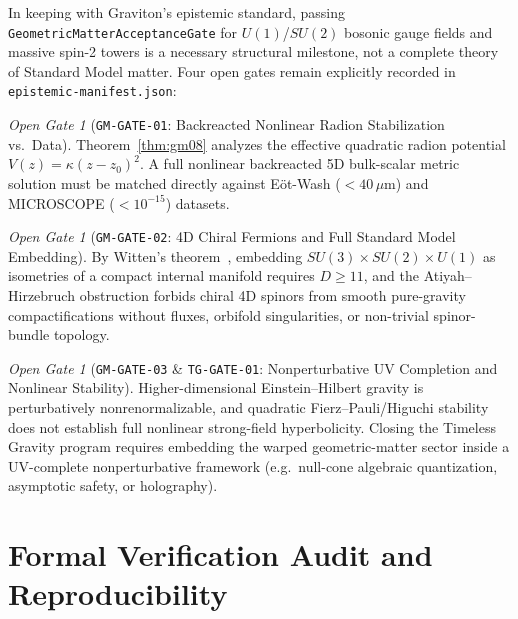 \documentclass[11pt,a4paper]{article}
\theoremstyle{plain}
\theoremstyle{remark}
\newtheorem{gate}[theorem]{Open Gate}
\newcommand{\code}[1]{\texttt{\small #1}}
\begin{document}
In keeping with Graviton's epistemic standard, passing \code{GeometricMatterAcceptanceGate} for $U(1)$/$SU(2)$ bosonic gauge fields and massive spin-2 towers is a necessary structural milestone, not a complete theory of Standard Model matter. Four open gates remain explicitly recorded in \code{epistemic-manifest.json}:

\begin{gate}[\code{GM-GATE-01}: Backreacted Nonlinear Radion Stabilization vs.\ Data]
Theorem~\ref{thm:gm08} analyzes the effective quadratic radion potential $V(z) = \kappa(z-z_0)^2$. A full nonlinear backreacted 5D bulk-scalar metric solution must be matched directly against E\"ot-Wash ($<40\,\mu\mathrm{m}$) and MICROSCOPE ($<10^{-15}$) datasets.
\end{gate}

\begin{gate}[\code{GM-GATE-02}: 4D Chiral Fermions and Full Standard Model Embedding]
By Witten's theorem~\cite{Witten1981}, embedding $SU(3)\times SU(2)\times U(1)$ as isometries of a compact internal manifold requires $D \ge 11$, and the Atiyah--Hirzebruch obstruction forbids chiral 4D spinors from smooth pure-gravity compactifications without fluxes, orbifold singularities, or non-trivial spinor-bundle topology.
\end{gate}

\begin{gate}[\code{GM-GATE-03} \& \code{TG-GATE-01}: Nonperturbative UV Completion and Nonlinear Stability]
Higher-dimensional Einstein--Hilbert gravity is perturbatively nonrenormalizable, and quadratic Fierz--Pauli/Higuchi stability does not establish full nonlinear strong-field hyperbolicity. Closing the Timeless Gravity program requires embedding the warped geometric-matter sector inside a UV-complete nonperturbative framework (e.g.\ null-cone algebraic quantization, asymptotic safety, or holography).
\end{gate}

\section{Formal Verification Audit and Reproducibility}
\label{sec:verification}
\end{document}
